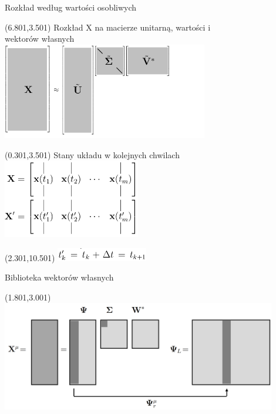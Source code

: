 \documentclass[aspectratio=169]{beamer}
\begin{document}
\begin{frame} {Rozkład według wartości osobliwych}
\begin{textblock}{13}(6.801,3.501)
	Rozkład X na macierze unitarną, wartości i \\ wektorów własnych \\
	\includegraphics[width=9cm]{imgs/a_truncated_svd.png}
\end{textblock}
\begin{textblock}{13}(0.301,3.501)
	Stany układu w kolejnych chwilach \\
	\includegraphics[width=6cm]{imgs/a_X_svd.png}
\end{textblock}
\begin{textblock}{13}(2.301,10.501)
	\includegraphics[width=4cm]{imgs/a_t_svd.png}
\end{textblock}
\end{frame}

\begin{frame} {Biblioteka wektorów własnych}
\begin{textblock}{13}(1.801,3.001)
	\includegraphics[width=12cm]{imgs/rom2.png}
\end{textblock}
\end{frame}
\end{document}
